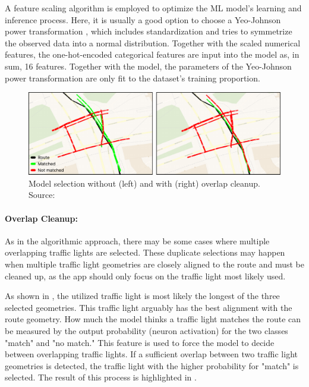 A feature scaling algorithm is employed to optimize the ML model's learning and inference process. Here, it is usually a good option to choose a Yeo-Johnson power transformation \cite{yeo_new_2000}, which includes standardization and tries to symmetrize the observed data into a normal distribution. Together with the scaled numerical features, the one-hot-encoded categorical features are input into the model as, in sum, 16 features. Together with the model, the parameters of the Yeo-Johnson power transformation are only fit to the dataset's training proportion.

\begin{figure}[t]
\centering
\includegraphics[width=\linewidth]{images/sg-selection-overlap-cleanup.pdf}
\caption{Model selection without (left) and with (right) overlap cleanup. Source: \cite{matthes2023geo}}
\label{fig:sg-selection-overlap-cleanup}
\end{figure}

\paragraph{Overlap Cleanup:} As in the algorithmic approach, there may be some cases where multiple overlapping traffic lights are selected. These duplicate selections may happen when multiple traffic light geometries are closely aligned to the route and must be cleaned up, as the app should only focus on the traffic light most likely used. 

As shown in , the utilized traffic light is most likely the longest of the three selected geometries. This traffic light arguably has the best alignment with the route geometry. How much the model thinks a traffic light matches the route can be measured by the output probability (neuron activation) for the two classes "match" and "no match." This feature is used to force the model to decide between overlapping traffic lights. If a sufficient overlap between two traffic light geometries is detected, the traffic light with the higher probability for "match" is selected. The result of this process is highlighted in .

